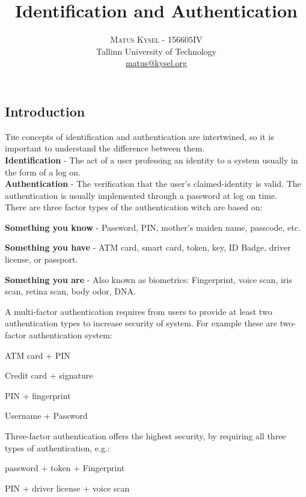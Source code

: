 \documentclass[twoside]{article}
\title{\vspace{-15mm}\fontsize{24pt}{10pt}\selectfont\textbf{Identification and
Authentication}} %
\author{
\large
\textsc{Matus Kysel - 156605IV}\\[2mm] %
\normalsize Tallinn University of Technology \\ %
\normalsize \href{mailto:matus@kysel.org}{matus@kysel.org} %
\vspace{-5mm}
}
\date{}
\begin{document}
\maketitle %

\thispagestyle{fancy} %


\begin{multicols}{2} %



\section{Introduction}
\lettrine[nindent=0em,lines=3]{T} he concepts of identification and authentication are intertwined, so it is important to understand the difference between them.\\
\textbf{Identification} - The act of a user professing an identity to a system usually in the form of a log on.\\
\textbf{Authentication} - The verification that the user's claimed-identity is valid. The authentication is usually implemented through a password at log on time.\\
There are three factor types of the authentication witch are based on:
\begin{compactitem}
\item \textbf{Something you know} - Password, PIN, mother's maiden name, passcode, etc.
\item \textbf{Something you have} - ATM card, smart card, token, key, ID Badge, driver license, or passport.
\item \textbf{Something you are} - Also known as biometrics: Fingerprint, voice scan, iris scan, retina scan, body odor, DNA.
\end{compactitem}
A multi-factor authentication requires from users to provide at least two authentication types to increase security of system. For example these are two-factor authentication system:
\begin{compactitem}
\item ATM card + PIN
\item Credit card + signature
\item PIN + fingerprint
\item Username + Password 
\end{compactitem}
Three-factor authentication offers the highest security, by requiring all three types of authentication, e.g.: 
\begin{compactitem}
\item password + token + Fingerprint
\item PIN + driver license + voice scan
\end{compactitem}


\end{multicols}
\end{document}
